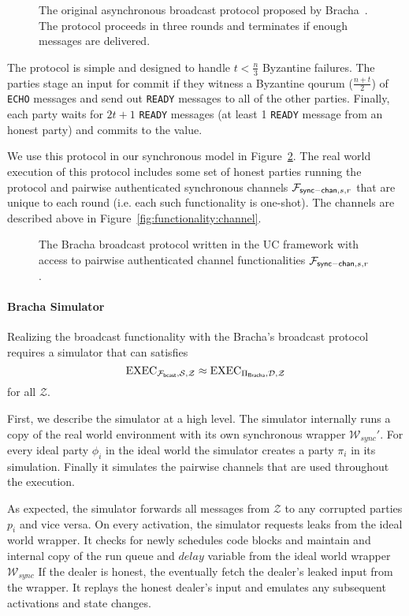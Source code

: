 \begin{figure}
	
	\caption{The original asynchronous broadcast protocol proposed by Bracha~\cite{bracha-broadcast}. The protocol proceeds in three rounds and terminates if enough messages are delivered.}
	\label{fig:protocol:asyncbracha}
\end{figure}

The protocol is simple and designed to handle $t < \frac{n}{3}$ Byzantine failures.
The parties stage an input for commit if they witness a Byzantine qourum ($\frac{n+t}{2}$) of \texttt{ECHO} messages and send out \texttt{READY} messages to all of the other parties.
Finally, each party waits for $2t + 1$ \texttt{READY} messages (at least 1 \texttt{READY} message from an honest party) and commits to the value.

We use this protocol in our synchronous model in Figure~\ref{fig:prot:bracha_ours}.
The real world execution of this protocol includes some set of honest parties running the protocol and pairwise authenticated synchronous channels $\mathcal{F}_{{\mathsf {sync-chan}},s,r}$ that are unique to each round (i.e. each such functionality is one-shot).
The channels are described above in Figure~\ref{fig:functionality:channel}.

\begin{figure}
	
	\caption{The Bracha broadcast protocol written in the UC framework with access to pairwise authenticated channel functionalities $\mathcal{F}_{{\mathsf {sync-chan}},s,r}$.}
	\label{fig:prot:bracha_ours}
\end{figure}

\paragraph{Bracha Simulator}
Realizing the broadcast functionality with the Bracha's broadcast protocol requires a simulator that can satisfies
\[ \text{EXEC}_{\mathcal{F_{{\mathsf {bcast}}}},\mathcal{S},\mathcal{Z}} \approx \text{EXEC}_{\Pi_{{\mathsf {Bracha}}},\mathcal{D},\mathcal{Z}} \]
for all $\mathcal{Z}$.

First, we describe the simulator at a high level.
The simulator internally runs a copy of the real world environment with its own synchronous wrapper $\mathcal{W}_{sync}'$.
For every ideal party $\phi_i$ in the ideal world the simulator creates a party $\pi_i$ in its simulation.
Finally it simulates the pairwise channels that are used throughout the execution.

As expected, the simulator forwards all messages from $\mathcal{Z}$ to any corrupted parties $p_i$ and vice versa.
On every activation, the simulator requests leaks from the ideal world wrapper.
It checks for newly schedules code blocks and maintain and internal copy of the run queue and $delay$ variable from the ideal world wrapper $\mathcal{W}_{sync}$
If the dealer is honest, the eventually fetch the dealer's leaked input from the wrapper. 
It replays the honest dealer's input and emulates any subsequent activations and state changes.

